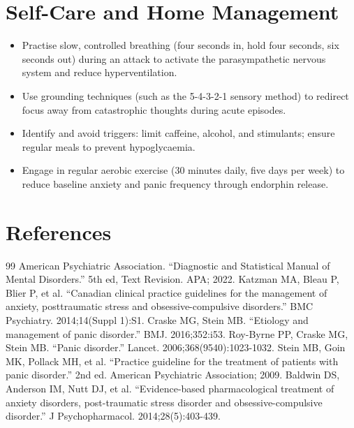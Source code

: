 \section*{Self-Care and Home Management}
\begin{itemize}
  \item Practise slow, controlled breathing (four seconds in, hold four seconds, six seconds out) during an attack to activate the parasympathetic nervous system and reduce hyperventilation.
  \item Use grounding techniques (such as the 5-4-3-2-1 sensory method) to redirect focus away from catastrophic thoughts during acute episodes.
  \item Identify and avoid triggers: limit caffeine, alcohol, and stimulants; ensure regular meals to prevent hypoglycaemia.
  \item Engage in regular aerobic exercise (30 minutes daily, five days per week) to reduce baseline anxiety and panic frequency through endorphin release.
\end{itemize}

\section*{References}
\begin{thebibliography}{99}
 American Psychiatric Association. ``Diagnostic and Statistical Manual of Mental Disorders.'' 5th ed, Text Revision. APA; 2022.
 Katzman MA, Bleau P, Blier P, et al. ``Canadian clinical practice guidelines for the management of anxiety, posttraumatic stress and obsessive-compulsive disorders.'' BMC Psychiatry. 2014;14(Suppl 1):S1.
 Craske MG, Stein MB. ``Etiology and management of panic disorder.'' BMJ. 2016;352:i53.
 Roy-Byrne PP, Craske MG, Stein MB. ``Panic disorder.'' Lancet. 2006;368(9540):1023-1032.
 Stein MB, Goin MK, Pollack MH, et al. ``Practice guideline for the treatment of patients with panic disorder.'' 2nd ed. American Psychiatric Association; 2009.
 Baldwin DS, Anderson IM, Nutt DJ, et al. ``Evidence-based pharmacological treatment of anxiety disorders, post-traumatic stress disorder and obsessive-compulsive disorder.'' J Psychopharmacol. 2014;28(5):403-439.
\end{thebibliography}
